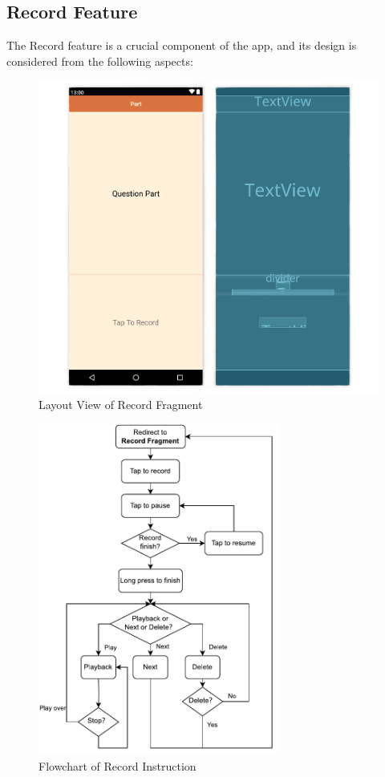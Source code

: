 \documentclass[conference,10pt,letterpaper]{IEEEtran}
\begin{document}
	\subsection{Record Feature}
	The Record feature is a crucial component of the app, and its design is considered from the following aspects:
	
	\begin{figure}[htbp]
		\centerline{\includegraphics[width=\columnwidth]{src/record layout remove.png}}
		\caption{Layout View of Record Fragment}
		\label{fig:record_layout}
	\end{figure}
	
	\begin{figure}[htbp]
		\centerline{\includegraphics[width=3.1in]{src/flowchart.pdf}}
		\caption{Flowchart of Record Instruction}
		\label{fig:flowhart}
	\end{figure}
	
\end{document}
